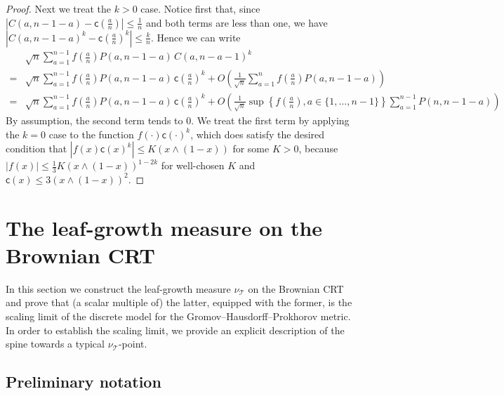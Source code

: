 \documentclass[11pt]{article}
\newcommand{\cc}{\mathsf{c}}
\newcommand{\ff}{\cc}
\renewcommand{\leq}{\leqslant}
\begin{document}
\begin{proof}
\vspace{1cm}

Next we treat the $k>0$ case. Notice first that, since $|C(a,n-1-a)-\ff(\frac{a}{n})|\leq \frac{1}{n}$ and both terms are less than one, we have $|C(a,n-1-a)^k-\ff(\frac{a}{n})^k|\leq \frac{k}{n}$. Hence we can write
\begin{align*}
   &\sqrt{n} \sum_{a=1}^{n-1} f{\left(\frac{a}{n}\right)}P(a,n-1-a)\,C(a,n-a-1)^k \\
   =&\sqrt{n}\sum_{a=1}^{n-1} f{\left(\frac{a}{n}\right)}P(a,n-1-a)\,\ff{\left(\frac{a}{n}\right)}^k +O\left( \frac1{\sqrt{n}}\sum_{a=1}^n f{\left(\frac{a}{n}\right)}P(a,n-1-a)\right) \\
   =&\sqrt{n}\sum_{a=1}^{n-1} f{\left(\frac{a}{n}\right)}P(a,n-1-a)\,\ff{\left(\frac{a}{n}\right)}^k+ O\left(\frac1{\sqrt{n}}\sup\left\{f{\left(\frac{a}{n}\right)},a\in\{1,\ldots,n-1\}\right\}\sum_{a=1}^{n-1}P(n,n-1-a)\right)
 \end{align*}
By assumption, the second term tends to $0$. We treat the first term by applying the $k=0$ case to the function $f(\cdot)\ff(\cdot)^k$, which does satisfy the desired condition that $|f(x)\ff(x)^k| \leq K(x\wedge (1-x))$ for some $K>0$, because $|f(x)|\leq \frac13K(x\wedge(1-x))^{1-2k}$ for well-chosen $K$ and $\ff(x) \leq 3 (x\wedge (1-x))^2$.
\end{proof}


\section{The leaf-growth measure on the Brownian CRT}\label{section:convergence}

In this section we construct the leaf-growth measure $\nu_\mathcal{T}$ on the Brownian CRT and prove that (a scalar multiple of) the latter, equipped with the former, is the scaling limit of the discrete model for the Gromov--Hausdorff--Prokhorov metric. In order to establish the scaling limit, we provide an explicit description of the spine towards a typical $\nu_\mathcal{T}$-point.

\subsection{Preliminary notation}
\end{document}
